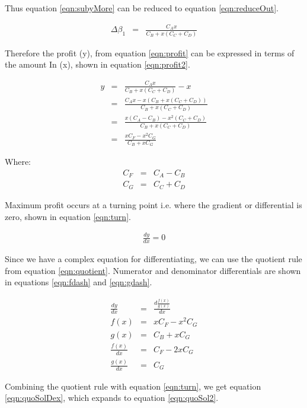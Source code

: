 \documentclass[runningheads]{llncs}
\begin{document}
Thus equation \ref{eqn:subyMore} can be reduced to equation \ref{eqn:reduceOut}.

\begin{eqnarray}
	\Delta\beta_{1}  &=& \frac{C_{A} x}{C_{B} + x(C_{C} + C_{D})} \label{eqn:reduceOut}
\end{eqnarray}

Therefore the profit (y), from equation \ref{eqn:profit} can be expressed in terms of the amount In (x), shown in equation \ref{eqn:profit2}.

\begin{eqnarray}
	y  &=& \frac{C_{A} x}{C_{B} + x(C_{C} + C_{D})} - x \label{eqn:profit2}\\
	&=& \frac{C_{A} x - x(C_{B} + x(C_{C} + C_{D}))}{C_{B} + x(C_{C} + C_{D})} \label{eqn:profit3}\\
	&=& \frac{x(C_{A} - C_{B}) - x^2(C_{C} + C_{D})}{C_{B} + x(C_{C} + C_{D})} \label{eqn:profit4}\\
	&=& \frac{x C_{F} - x^2 C_{G} }{C_{B} + x C_{G}} \label{eqn:profit5}
\end{eqnarray}

Where:
\begin{eqnarray}
	C_{F}  &=& C_{A} - C_{B}\\
	C_{G}  &=& C_{C} + C_{D}
\end{eqnarray}

Maximum profit occurs at a turning point i.e. where the gradient or differential is zero, shown in equation \ref{eqn:turn}.

\begin{eqnarray}
	\frac{dy}{dx} = 0 \label{eqn:turn}
\end{eqnarray}

Since we have a complex equation for differentiating, we can use the quotient rule from equation \ref{eqn:quotient}. Numerator and denominator differentials are shown in equations \ref{eqn:fdash} and \ref{eqn:gdash}.

\begin{eqnarray}
	\frac{dy}{dx} &=& \frac{d \frac{ f(x)}{g(x)}}{dx} \label{eqn:turn2}\\
	f(x) &=& x C_{F} - x^2 C_{G} \label{eqn:f}\\
	g(x) &=& C_{B} + x C_{G} \label{eqn:g}\\
	\frac{f(x)}{dx} &=& C_{F} - 2 x C_{G} \label{eqn:fdash}\\
	\frac{g(x)}{dx} &=& C_{G} \label{eqn:gdash}
\end{eqnarray}

Combining the quotient rule with equation \ref{eqn:turn}, we get equation \ref{eqn:quoSolDex}, which expands to equation \ref{eqn:quoSol2}.
\end{document}
